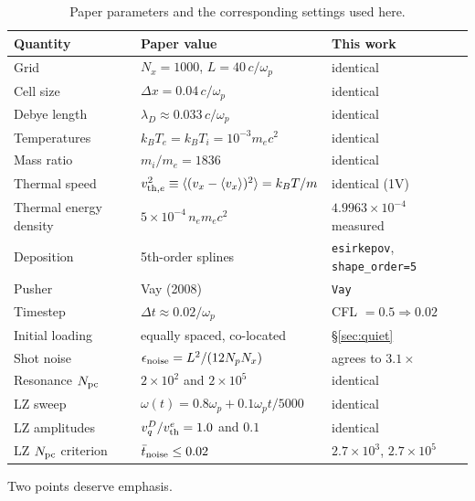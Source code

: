 \documentclass[11pt,a4paper]{article}
\newcommand{\code}[1]{\texttt{\small #1}}
\newcommand{\vth}{v_{\rm th}^{e}}
\newcommand{\vthsq}{v_{{\rm th},e}^{2}}
\newcommand{\Npc}{N_{\rm pc}}
\begin{document}
\begin{table}[h]
\centering\small
\begin{tabular}{@{}lll@{}}
\toprule
Quantity & Paper value & This work \\
\midrule
Grid                  & $N_x = 1000$, $L = 40\,c/\omega_p$ & identical \\
Cell size             & $\Delta x = 0.04\,c/\omega_p$      & identical \\
Debye length          & $\lambda_D \approx 0.033\,c/\omega_p$ & identical \\
Temperatures          & $k_BT_e = k_BT_i = 10^{-3}m_ec^2$  & identical \\
Mass ratio            & $m_i/m_e = 1836$                   & identical \\
Thermal speed         & $\vthsq \equiv \langle(v_x-\langle v_x\rangle)^2\rangle = k_BT/m$ & identical (1V) \\
Thermal energy density& $5\times10^{-4}\,n_em_ec^2$        & $4.9963\times10^{-4}$ measured \\
Deposition            & 5th-order splines                  & \code{esirkepov}, \code{shape\_order=5} \\
Pusher                & Vay (2008)                         & \code{Vay} \\
Timestep              & $\Delta t \approx 0.02/\omega_p$   & CFL $=0.5 \Rightarrow 0.02$ \\
Initial loading       & equally spaced, co-located         & \S\ref{sec:quiet} \\
Shot noise            & $\epsilon_{\rm noise} = L^2/(12 N_p N_x)$ & agrees to $3.1\times$ \\
Resonance $\Npc$      & $2\times10^2$ and $2\times10^5$    & identical \\
LZ sweep              & $\omega(t) = 0.8\omega_p + 0.1\omega_p t/5000$ & identical \\
LZ amplitudes         & $v_q^D/\vth = 1.0$ and $0.1$       & identical \\
LZ $\Npc$ criterion   & $\bar t_{\rm noise} \le 0.02$      & $2.7\times10^3$, $2.7\times10^5$ \\
\bottomrule
\end{tabular}
\caption{Paper parameters and the corresponding settings used here.}
\end{table}

Two points deserve emphasis.
\end{document}
